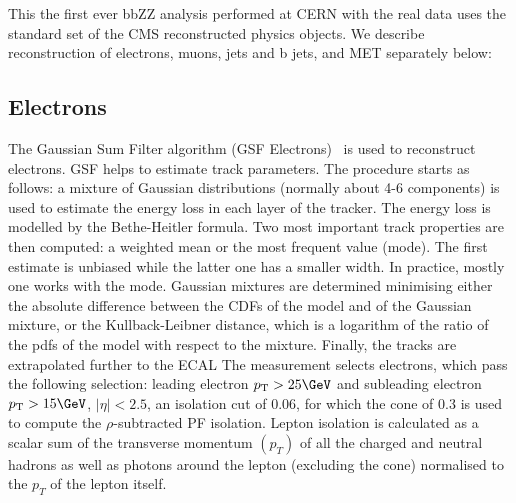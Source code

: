 This the first ever bbZZ analysis performed at CERN with the real data uses the standard set of the CMS
reconstructed physics objects. We describe reconstruction of
electrons, muons, jets and b jets, and MET separately below:



\subsection{Electrons\label{sec:electrons}}
The Gaussian Sum Filter algorithm (GSF
Electrons)~\cite{Khachatryan:2015hwa} is used to reconstruct
electrons. GSF helps to estimate track parameters. The procedure starts as follows: a mixture of Gaussian distributions (normally about 4-6 components) \cite{GSF} is used to estimate the energy loss in each layer of the tracker. The energy loss is modelled by the Bethe-Heitler formula. Two most important track properties are then computed: a weighted mean or the most frequent value (mode). The first estimate is unbiased while the latter one has a smaller width. In practice, mostly one works with the mode. Gaussian mixtures are determined minimising either the absolute difference between the CDFs of the model and of the Gaussian mixture, or the Kullback-Leibner distance, which is a logarithm of the ratio of the pdfs of the model with respect to the mixture. Finally, the tracks are extrapolated further to the ECAL The measurement selects electrons, which pass the following selection:
leading electron $\pt>25\GeV$ and subleading electron $\pt>15\GeV$, $|\eta|<2.5$, 
an isolation cut of 0.06, for which the cone
of $0.3$ is used to compute the $\rho$-subtracted PF
isolation. Lepton isolation is calculated as a scalar sum of
the transverse momentum $(p_{T})$ of all the charged and
neutral hadrons as well as photons around the lepton
(excluding the cone) normalised to the $p_{T}$ of the lepton
itself. 

        

